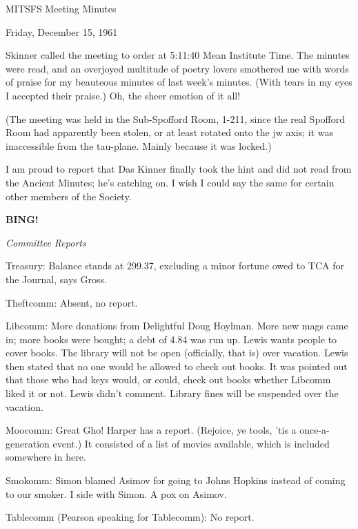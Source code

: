 \documentclass[12pt]{article}
\newcommand{\bing}{{\bf BING!} }
\newcommand{\goto}[1]{\bing \vskip 12pt \centerline{{\em{#1}}}}
\begin{document}
\begin{center}

MITSFS Meeting Minutes

Friday, December 15, 1961

\end{center}
 
\vspace{12pt}

\setlength{\parskip}{6pt}

\noindent
Skinner called the meeting to order at 5:11:40 Mean Institute Time. The minutes were read, and an overjoyed multitude of poetry lovers smothered me with words of praise for my beauteous minutes of last week's minutes. (With tears in my eyes I accepted their praise.) Oh, the sheer emotion of it all!

(The meeting was held in the Sub-Spofford Room, 1-211, since the real Spofford Room had apparently been stolen, or at least rotated onto the jw axis; it was inaccessible from the tau-plane. Mainly because it was locked.)

I am proud to report that Das Kinner finally took the hint and did not read from the Ancient Minutes; he's catching on. I wish I could say the same for certain other members of the Society.

\goto{Committee Reports}

Treasury: Balance stands at 299.37, excluding a minor fortune owed to TCA for the Journal, says Gross.

Theftcomm: Absent, no report.

Libcomm: More donations from Delightful Doug Hoylman. More new mags came in; more books were bought; a debt of 4.84 was run up. Lewis wants people to cover books. The library will not be open (officially, that is) over vacation. Lewis then stated that no one would be allowed to check out books. It was pointed out that those who had keys would, or could, check out books whether Libcomm liked it or not. Lewis didn't comment. Library fines will be suspended over the vacation.

Moocomm: Great Gho! Harper has a report. (Rejoice, ye tools, 'tis a once-a-generation event.) It consisted of a list of movies available, which is included somewhere in here.

Smokomm: Simon blamed Asimov for going to Johns Hopkins instead of coming to our smoker. I side with Simon. A pox on Asimov.

Tablecomm (Pearson speaking for Tablecomm): No report.
\end{document}
